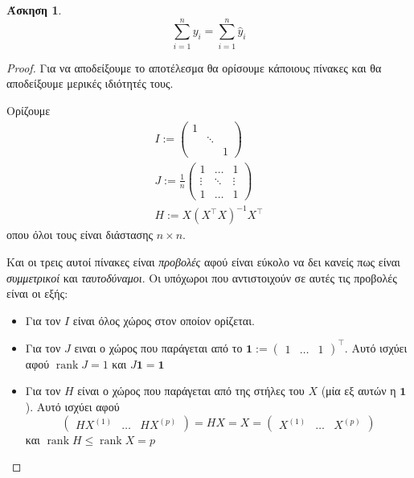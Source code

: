 \documentclass{article}
\DeclareMathOperator{\rank}{\mathrm{rank}}
\newcommand{\T}[1]{{#1}^{\top}}  %
\newcommand{\ve}[1]{\boldsymbol{#1}}
\newtheorem{exercise}{Άσκηση}[section]
\begin{document}
\begin{exercise}
    \begin{equation*}
        \sum_{i=1}^n y_i = \sum_{i=1}^n \hat{y}_i
    \end{equation*}
\end{exercise}
\begin{proof}
    Για να αποδείξουμε το αποτέλεσμα θα ορίσουμε κάποιους πίνακες και θα αποδείξουμε μερικές ιδιότητές τους.

    Ορίζουμε
    \begin{align*}
        Ι := \begin{pmatrix}
            1 & & \\
             & \ddots & \\
             & & 1
        \end{pmatrix}\\
        J := \frac{1}{n} \begin{pmatrix}
            1 & \dots & 1\\
            \vdots & \ddots & \vdots\\
            1 & \dots & 1
        \end{pmatrix}\\
        H := X (\T{X} X)^{-1} \T{X}
    \end{align*}
    οπου όλοι τους είναι διάστασης \(n \times n\).

    Και οι τρεις αυτοί πίνακες είναι \emph{προβολές} αφού είναι εύκολο να δει κανείς πως είναι \emph{συμμετρικοί} και \emph{ταυτοδύναμοι}. Οι υπόχωροι που αντιστοιχούν σε αυτές τις προβολές είναι οι εξής:
    \begin{itemize}
        \item Για τον \(I\) είναι όλος χώρος στον οποίον ορίζεται.
        \item Για τον \(J\) ειναι ο χώρος που παράγεται από το \(\ve{1} := \T{\begin{pmatrix} 1 & \dots & 1 \end{pmatrix}}\).
            Αυτό ισχύει αφού \(\rank J = 1\) και \( J \ve{1} = \ve{1} \) 
        \item Για τον \(H\) είναι ο χώρος που παράγεται από της στήλες του \(X\) (μία εξ αυτών η \(\ve{1}\)). Aυτό ισχύει αφού
        \begin{equation*}
            \begin{pmatrix} HX^{(1)} & \dots & HX^{(p)} \end{pmatrix} = HX = X = \begin{pmatrix} X^{(1)} & \dots & X^{(p)} \end{pmatrix}
        \end{equation*}
        και \(\rank H \leq \rank X = p\)
    \end{itemize}


\end{proof}
\end{document}
